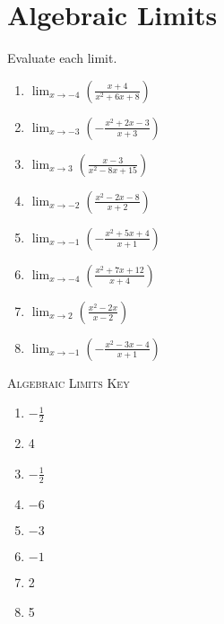 \chapter{Algebraic Limits}

Evaluate each limit.

\begin{enumerate}
	\item $\lim_{x \to -4} \left(\frac{x+4}{x^2+6x+8}\right)$
	\item $\lim_{x \to -3} \left(-\frac{x^2+2x-3}{x+3}\right)$
	\item $\lim_{x \to 3} \left(\frac{x-3}{x^2-8x+15}\right)$
	\item $\lim_{x \to -2} \left(\frac{x^2-2x-8}{x+2}\right)$
	\item $\lim_{x \to -1} \left(-\frac{x^2+5x+4}{x+1}\right)$
	\item $\lim_{x \to -4} \left(\frac{x^2+7x+12}{x+4}\right)$
	\item $\lim_{x \to 2} \left(\frac{x^2-2x}{x-2}\right)$
	\item $\lim_{x \to -1} \left(-\frac{x^2-3x-4}{x+1}\right)$
\end{enumerate}

\newpage

\textsc{Algebraic Limits Key}

\begin{enumerate}
	\item $-\frac{1}{2}$
	\item 4
	\item $-\frac{1}{2}$
	\item $-6$
	\item $-3$
	\item $-1$
	\item 2
	\item 5
\end{enumerate}